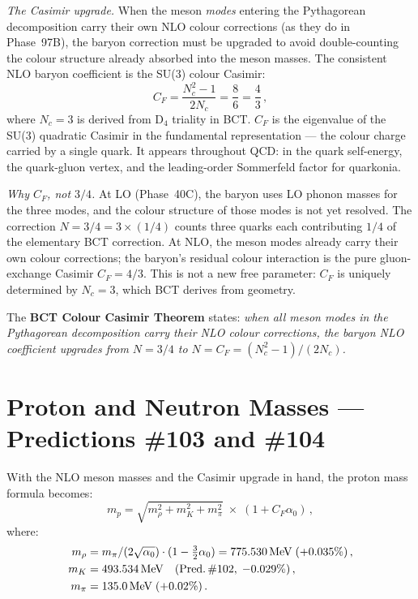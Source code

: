\documentclass[twocolumn,10pt,a4paper]{article}
\begin{document}
\textit{The Casimir upgrade.}\quad
When the meson \emph{modes} entering the Pythagorean decomposition carry
their own NLO colour corrections (as they do in Phase~97B), the baryon
correction must be upgraded to avoid double-counting the colour structure
already absorbed into the meson masses.  The consistent NLO baryon
coefficient is the SU(3) colour Casimir:
\begin{equation}
  \label{eq:CF}
  C_F = \frac{N_c^2-1}{2N_c} = \frac{8}{6} = \frac{4}{3}\,,
\end{equation}
where $N_c=3$ is derived from D$_4$ triality in BCT.  $C_F$ is the
eigenvalue of the SU(3) quadratic Casimir in the fundamental
representation --- the colour charge carried by a single quark.  It appears
throughout QCD: in the quark self-energy, the quark-gluon vertex, and the
leading-order Sommerfeld factor for quarkonia.

\textit{Why $C_F$, not $3/4$.}\quad
At LO (Phase~40C), the baryon uses LO phonon masses for the three modes,
and the colour structure of those modes is not yet resolved.  The correction
$N=3/4 = 3\times(1/4)$ counts three quarks each contributing $1/4$ of the
elementary BCT correction.  At NLO, the meson modes already carry their
own colour corrections; the baryon's residual colour interaction is the
pure gluon-exchange Casimir $C_F = 4/3$.  This is not a new free
parameter: $C_F$ is uniquely determined by $N_c=3$, which BCT derives
from geometry.

The \textbf{BCT Colour Casimir Theorem} states: \emph{when all meson
modes in the Pythagorean decomposition carry their NLO colour corrections,
the baryon NLO coefficient upgrades from $N = 3/4$ to $N = C_F = (N_c^2-1)/(2N_c)$.}

\section{Proton and Neutron Masses — Predictions \#103 and \#104}

With the NLO meson masses and the Casimir upgrade in hand, the proton mass
formula becomes:
\begin{equation}
  \label{eq:mp103}
  m_p = \sqrt{m_\rho^2 + m_K^2 + m_\pi^2}\;\times\;(1+C_F\alpha_0)\,,
\end{equation}
where:
\begin{align*}
  m_\rho &= m_\pi/(2\sqrt{\alpha_0})\cdot(1-\tfrac{3}{2}\alpha_0)
             = 775.530\,\mathrm{MeV}\;({+0.035\%})\,,\\
  m_K    &= 493.534\,\mathrm{MeV}\quad(\text{Pred.\,\#102},\;{-0.029\%})\,,\\
  m_\pi  &= 135.0\,\mathrm{MeV}\;({+0.02\%})\,.
\end{align*}
\end{document}
